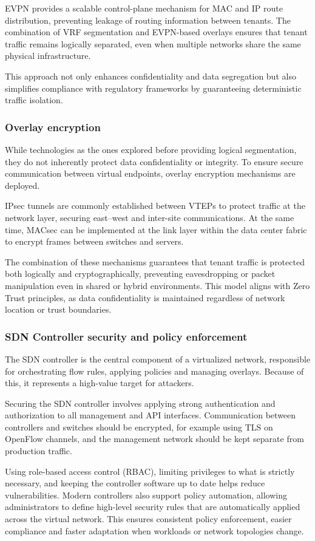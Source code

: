 EVPN provides a scalable control-plane mechanism for MAC and IP route distribution, preventing leakage of routing information between tenants. The combination of VRF segmentation and EVPN-based overlays ensures that tenant traffic remains logically separated, even when multiple networks share the same physical infrastructure.

This approach not only enhances confidentiality and data segregation but also simplifies compliance with regulatory frameworks by guaranteeing deterministic traffic isolation.

\subsubsection{Overlay encryption}

While technologies as the ones explored before providing logical segmentation, they do not inherently protect data confidentiality or integrity. To ensure secure communication between virtual endpoints, overlay encryption mechanisms are deployed.

IPsec tunnels are commonly established between VTEPs to protect traffic at the network layer, securing east–west and inter-site communications. At the same time, MACsec can be implemented at the link layer within the data center fabric to encrypt frames between switches and servers.

The combination of these mechanisms guarantees that tenant traffic is protected both logically and cryptographically, preventing eavesdropping or packet manipulation even in shared or hybrid environments. This model aligns with Zero Trust principles, as data confidentiality is maintained regardless of network location or trust boundaries.

\subsubsection{SDN Controller security and policy enforcement}

The SDN controller is the central component of a virtualized network, responsible for orchestrating flow rules, applying policies and managing overlays. Because of this, it represents a high-value target for attackers.

Securing the SDN controller involves applying strong authentication and authorization to all management and API interfaces. Communication between controllers and switches should be encrypted, for example using TLS on OpenFlow channels, and the management network should be kept separate from production traffic.

Using role-based access control (RBAC), limiting privileges to what is strictly necessary, and keeping the controller software up to date helps reduce vulnerabilities. Modern controllers also support policy automation, allowing administrators to define high-level security rules that are automatically applied across the virtual network. This ensures consistent policy enforcement, easier compliance and faster adaptation when workloads or network topologies change.